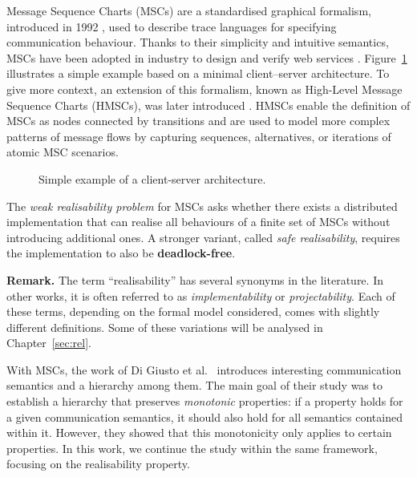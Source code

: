Message Sequence Charts (MSCs) are a standardised graphical formalism,
introduced in 1992 \cite{MSCStandard}, used to describe trace languages 
for specifying communication behaviour. Thanks to their simplicity and 
intuitive semantics, MSCs have been adopted in industry to design
and verify web services \cite{foster2003model}.
Figure~\ref{fig:msc-cli-ser} illustrates a simple example based on a
minimal client–server architecture. To give more context, 
an extension of this formalism,
known as High-Level Message Sequence Charts (HMSCs), was later
introduced \cite{HMSCStandard}. HMSCs enable the definition of
MSCs as nodes connected by transitions and are used to model more
complex patterns of message flows by capturing sequences, alternatives,
or iterations of atomic MSC scenarios.

\begin{figure}[!ht]
\centering
\begin{msc}[draw frame=none, draw head=none, msc keyword=, head height=0px, label distance=0.5ex, foot height=0px, foot distance=0px]{}

	\nextlevel
\end{msc}
\caption{Simple example of a client-server architecture.}
\label{fig:msc-cli-ser}
\end{figure}

The \emph{weak realisability problem} for MSCs asks whether there 
exists a distributed implementation that can realise all behaviours of a 
finite set of MSCs without introducing additional ones. A stronger variant, 
called \emph{safe realisability}, requires the implementation to also be 
\textbf{deadlock-free}. 

\textbf{Remark.} The term ``realisability'' has several synonyms in the
literature. In other works, it is often referred to as 
\emph{implementability} or \emph{projectability}. Each of these terms, 
depending on the formal model considered, comes with slightly different 
definitions. Some of these variations will be analysed in 
Chapter~\ref{sec:rel}.

With MSCs, the work of Di Giusto et al.~\cite{di2023partial} introduces
interesting communication semantics and a hierarchy among them. The main
goal of their study was to establish a hierarchy that preserves
\emph{monotonic} properties: if a property holds for a given communication
semantics, it should also hold for all semantics contained within it.
However, they showed that this monotonicity only applies to certain
properties. In this work, we continue the study within the same framework,
focusing on the realisability property.  

